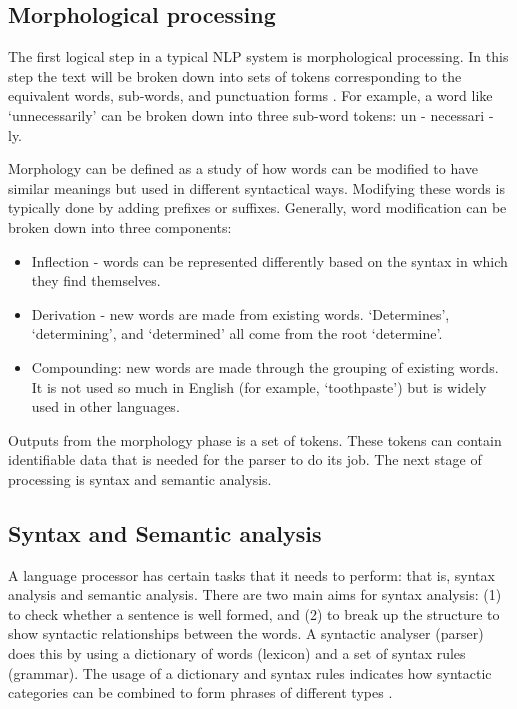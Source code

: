 \subsection{Morphological processing}

The first logical step in a typical NLP system is morphological processing. In this step the text will be broken down into sets of tokens corresponding to the equivalent words, sub-words, and punctuation forms \cite{Bates9977}. For example, a word like ‘unnecessarily’ can be broken down into three sub-word tokens: un - necessari - ly.

Morphology can be defined as a study of how words can be modified to have similar meanings but used in different syntactical ways. Modifying these words is typically done by adding prefixes or suffixes. Generally, word modification can be broken down into three components:

\begin{itemize}
    \item Inflection - words can be represented differently based on the syntax in which they find themselves.
    \item Derivation - new words are made from existing words. ‘Determines’, ‘determining’, and ‘determined’ all come from the root ‘determine’.
    \item Compounding: new words are made through the grouping of existing words. It is not used so much in English (for example, ‘toothpaste’) but is widely used in other languages.
\end{itemize}

Outputs from the morphology phase is a set of tokens. These tokens can contain identifiable data that is needed for the parser to do its job. The next stage of processing is syntax and semantic analysis.

\subsection{Syntax and Semantic analysis}

A language processor has certain tasks that it needs to perform: that is, syntax analysis and semantic analysis. There are two main aims for syntax analysis: (1) to check whether a sentence is well formed, and (2) to break up the structure to show syntactic relationships between the words. A syntactic analyser (parser) does this by using a dictionary of words (lexicon) and a set of syntax rules (grammar). The usage of a dictionary and syntax rules indicates how syntactic categories can be combined to form phrases of different types \cite{nation2007dissecting,liddy2001natural,feldman1999nlp}.

